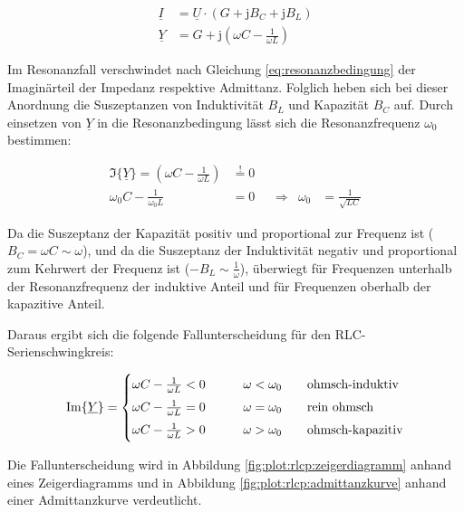 \begin{frame}
{            \begin{align}
                \underline{I} &= \underline{U} \cdot \left(G + \mathrm{j}B_C + \mathrm{j}B_L\right)\\
                \underline{Y} &= G + \mathrm{j}\left(\omega C - \frac{1}{\omega L}\right)\label{eq:rlcp:y}
            \end{align}
            
            Im Resonanzfall verschwindet nach Gleichung \ref{eq:resonanzbedingung} der Imaginärteil der Impedanz respektive Admittanz.
            Folglich heben sich bei dieser Anordnung die Suszeptanzen von Induktivität $B_L$ und Kapazität $B_C$ auf.
            Durch einsetzen von $\underline{Y}$ in die Resonanzbedingung lässt sich die Resonanzfrequenz $\omega_0$ bestimmen:
        
            \begin{equation}\label{eq:rlcp:w0}
                \begin{aligned}
                    \Im\{\underline{Y}\} = \left(\omega C - \frac{1}{\omega L}\right) &\overset{!}{=} 0 \\
                    \omega_0 C - \frac{1}{\omega_0 L} &= 0 &&\Rightarrow& \omega_0 &= \frac{1}{\sqrt{LC}}
                \end{aligned}
            \end{equation}
        
            Da die Suszeptanz der Kapazität positiv und proportional zur Frequenz ist ($B_C = \omega C \sim \omega$),
            und da die Suszeptanz der Induktivität negativ und proportional zum Kehrwert der Frequenz ist ($-B_L \sim \frac{1}{\omega}$),
            überwiegt für Frequenzen unterhalb der Resonanzfrequenz der induktive Anteil und für Frequenzen oberhalb der kapazitive Anteil.
        
            Daraus ergibt sich die folgende Fallunterscheidung für den RLC-Serienschwingkreis:
        
            \begin{equation}
                \Im\{\underline{Y}\} =
            \begin{cases}
                \omega C - \frac{1}{\omega L} < 0 & \qquad \omega < \omega_0 \qquad\text{ohmsch-induktiv}\vphantom{\Big|}\\
                \omega C - \frac{1}{\omega L} = 0 & \qquad \omega = \omega_0 \qquad\text{rein ohmsch}\vphantom{\Big|}\\
                \omega C - \frac{1}{\omega L} > 0 & \qquad \omega > \omega_0 \qquad\text{ohmsch-kapazitiv}\vphantom{\Big|}
            \end{cases}
            \label{eq:rlcp:fallunterscheidung}
            \end{equation}
        
            Die Fallunterscheidung wird in Abbildung \ref{fig:plot:rlcp:zeigerdiagramm} anhand eines Zeigerdiagramms 
            und in Abbildung \ref{fig:plot:rlcp:admittanzkurve} anhand einer Admittanzkurve verdeutlicht.
        }%
\end{frame}

